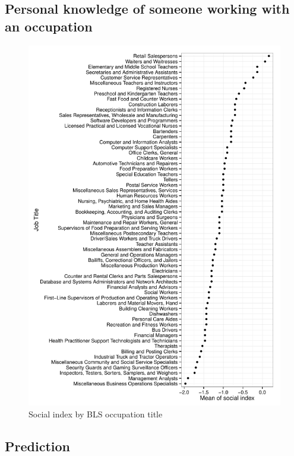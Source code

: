 \documentclass[11pt]{article}
\begin{document}
\subsection{Personal knowledge of someone working with an occupation} 

\begin{figure}
\caption{Social index by BLS occupation title} \label{fig:social_by_occupation}  
\centering
\begin{minipage}{0.95 \linewidth}
\includegraphics[width = \linewidth]{./plots/social_by_occupation.pdf}
\end{minipage}  
\end{figure} 

\subsection{Prediction} 
\end{document}
